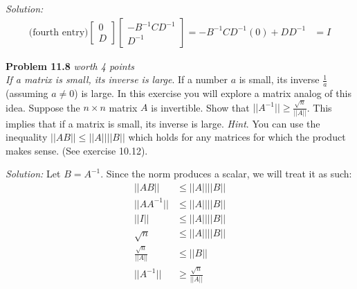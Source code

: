 \documentclass{article}
\newenvironment{problem}[3][Problem]
    { \begin{mdframed}[backgroundcolor=gray!20] \textbf{#1 #2} \textit{worth #3 points} \\}
    {  \end{mdframed}}
\newenvironment{solution}
    {\textit{Solution:}}
    {}
\begin{document}
\begin{solution}
\begin{align*}
    \text{(fourth entry)}\begin{bmatrix} 0 \\ D \end{bmatrix}\begin{bmatrix} -B^{-1}CD^{-1} \\ D^{-1} \end{bmatrix} = -B^{-1}CD^{-1}(0) + DD^{-1} &= I
\end{align*}
\end{solution}


\begin{problem}{11.8}{4}
\textit{If a matrix is small, its inverse is large}. If a number $a$ is small, its inverse $\frac{1}{a}$ (assuming $a\neq 0$) is large. In this exercise you will explore a matrix analog of this idea. Suppose the $n\times n$ matrix $A$ is invertible. Show that $\lvert\lvert A^{-1}\rvert\rvert\geq\frac{\sqrt{n}}{\lvert\lvert A\rvert\rvert}$. This implies that if a matrix is small, its inverse is large. \textit{Hint}. You can use the inequality $\lvert\lvert AB\rvert\rvert \leq \lvert\lvert A\rvert\rvert\lvert\lvert B\rvert\rvert$ which holds for any matrices for which the product makes sense. (See exercise {\color{red} 10.12}).
\end{problem}
\begin{solution}
Let $B = A^{-1}$. Since the norm produces a scalar, we will treat it as such:
\begin{align*}
    \lvert\lvert AB\rvert\rvert&\leq\lvert\lvert A\rvert\rvert\lvert\lvert B\rvert\rvert\\
    \lvert\lvert AA^{-1}\rvert\rvert&\leq\lvert\lvert A\rvert\rvert\lvert\lvert B\rvert\rvert\\
    \lvert\lvert I\rvert\rvert&\leq\lvert\lvert A\rvert\rvert\lvert\lvert B\rvert\rvert\\
    \sqrt{n}&\leq\lvert\lvert A\rvert\rvert\lvert\lvert B\rvert\rvert\\
    \frac{\sqrt{n}}{\lvert\lvert A\rvert\rvert}&\leq\lvert\lvert B\rvert\rvert\\
    \lvert\lvert A^{-1}\rvert\rvert&\geq\frac{\sqrt{n}}{\lvert\lvert A\rvert\rvert}
\end{align*}
\end{solution}
\newpage
\end{document}
